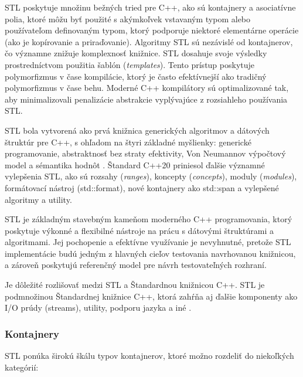 \documentclass[11pt]{article}
\begin{document}
STL poskytuje množinu bežných tried pre C++, ako sú kontajnery a asociatívne polia, ktoré môžu byť použité s akýmkoľvek vstavaným typom alebo používateľom definovaným typom, ktorý podporuje niektoré elementárne operácie (ako je kopírovanie a priraďovanie). Algoritmy STL sú nezávislé od kontajnerov, čo významne znižuje komplexnosť knižnice. STL dosahuje svoje výsledky prostredníctvom použitia šablón (\textit{templates}). Tento prístup poskytuje polymorfizmus v čase kompilácie, ktorý je často efektívnejší ako tradičný polymorfizmus v čase behu. Moderné C++ kompilátory sú optimalizované tak, aby minimalizovali penalizácie abstrakcie vyplývajúce z rozsiahleho používania STL.

STL bola vytvorená ako prvá knižnica generických algoritmov a dátových štruktúr pre C++, s ohľadom na štyri základné myšlienky: generické programovanie, abstraktnosť bez straty efektivity, Von Neumannov výpočtový model a sémantika hodnôt \cite{c++_musser}. Štandard C++20 priniesol ďalšie významné vylepšenia STL, ako sú rozsahy (\textit{ranges}), koncepty (\textit{concepts}), moduly (\textit{modules}), formátovací nástroj (std::format), nové kontajnery ako std::span a vylepšené algoritmy a utility.

STL je základným stavebným kameňom moderného C++ programovania, ktorý poskytuje výkonné a flexibilné nástroje na prácu s dátovými štruktúrami a algoritmami. Jej pochopenie a efektívne využívanie je nevyhnutné, pretože STL implementácie budú jedným z hlavných cieľov testovania navrhovanou knižnicou, a zároveň poskytujú referenčný model pre návrh testovateľných rozhraní.

Je dôležité rozlišovať medzi STL a Štandardnou knižnicou C++. STL je podmnožinou Štandardnej knižnice C++, ktorá zahŕňa aj ďalšie komponenty ako I/O prúdy (streams), utility, podporu jazyka a iné \cite{stackoverflow_stl_vs_stdlib}.

\subsubsection{Kontajnery}

STL ponúka širokú škálu typov kontajnerov, ktoré možno rozdeliť do niekoľkých kategórií:
\end{document}
